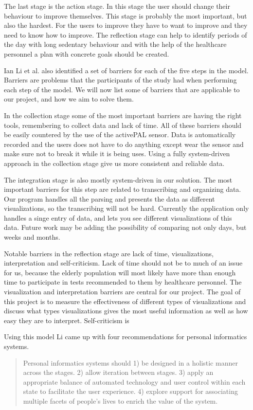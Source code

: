The last stage is the action stage. In this stage the user should change their behaviour to improve themselves. This stage is probably the most important, but also the hardest. For the users to improve they have to want to improve and they need to know how to improve. The reflection stage can help to identify periods of the day with long sedentary behaviour and with the help of the healthcare personnel a plan with concrete goals should be created. 

Ian Li et al. also identified a set of barriers for each of the five steps in the model. Barriers are problems that the participants of the study had when performing each step of the model. We will now list some of barriers that are applicable to our project, and how we aim to solve them. 

In the collection stage some of the most important barriers are having the right tools, remembering to collect data and lack of time. All of these barriers should be easily countered by the use of the activePAL sensor. Data is automatically recorded and the users does not have to do anything except wear the sensor and make sure not to break it while it is being uses. Using a fully system-driven approach in the collection stage give us more consistent and reliable data.

The integration stage is also mostly system-driven in our solution. The most important barriers for this step are related to transcribing and organizing data. Our program handles all the parsing and presents the data as different visualizations, so the transcribing will not be hard. Currently the application only handles a singe entry of data, and lets you see different visualizations of this data. Future work may be adding the possibility of comparing not only days, but weeks and months.

Notable barriers in the reflection stage are lack of time, visualizations, interpretation and self-criticism. Lack of time should not be to much of an issue for us, because the elderly population will most likely have more than enough time to participate in tests recommended to them by healthcare personnel. The visualization and interpretation barriers are central for our project. The goal of this project is to measure the effectiveness of different types of visualizations and discuss what types visualizations gives the most useful information as well as how easy they are to interpret. Self-criticism is  

Using this model Li %
came up with four recommendations for personal informatics systems. 
\begin{quote}
	Personal informatics systems should
	1) be designed in a holistic manner across the stages.
	2) allow iteration between stages.
	3) apply an appropriate balance of automated technology and user control within each state to facilitate the user experience.
	4) explore support for associating multiple facets of people's lives to enrich the value of the system.
\end{quote}
